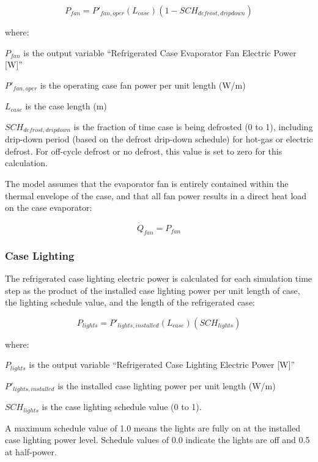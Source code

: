 \begin{equation}
{P_{fan}} = {P'}_{fan,oper}\left( {{L_{case}}} \right)\left( {1 - SC{H_{defrost,dripdown}}} \right)
\end{equation}

where:

\({P_{fan}}\) is the output variable ``Refrigerated Case Evaporator Fan Electric Power {[}W{]}''

\({P'}_{fan,oper}\) is the operating case fan power per unit length (W/m)

\({L_{case}}\) is the case length (m)

\(SC{H_{defrost,dripdown}}\) is the fraction of time case is being defrosted (0 to 1), including drip-down period (based on the defrost drip-down schedule) for hot-gas or electric defrost. For off-cycle defrost or no defrost, this value is set to zero for this calculation.

The model assumes that the evaporator fan is entirely contained within the thermal envelope of the case, and that all fan power results in a direct heat load on the case evaporator:

\begin{equation}
{\dot Q_{fan}} = {P_{fan}}
\end{equation}

\subsubsection{Case Lighting}\label{case-lighting}

The refrigerated case lighting electric power is calculated for each simulation time step as the product of the installed case lighting power per unit length of case, the lighting schedule value, and the length of the refrigerated case:

\begin{equation}
{P_{lights}} = P{'_{lights,installed}}({L_{case}})(SC{H_{lights}})
\end{equation}

where:

\({P_{lights}}\) is the output variable ``Refrigerated Case Lighting Electric Power {[}W{]}''

\(P{'_{lights,installed}}\) is the installed case lighting power per unit length (W/m)

\(SC{H_{lights}}\) is the case lighting schedule value (0 to 1).

A maximum schedule value of 1.0 means the lights are fully on at the installed case lighting power level. Schedule values of 0.0 indicate the lights are off and 0.5 at half-power.

